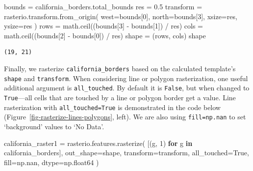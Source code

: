 \documentclass[
  letterpaper,
]{krantz}
\newenvironment{Shaded}{\begin{snugshade}}{\end{snugshade}}
\newcommand{\ControlFlowTok}[1]{\textcolor[rgb]{0.00,0.23,0.31}{\textbf{#1}}}
\newcommand{\DecValTok}[1]{\textcolor[rgb]{0.68,0.00,0.00}{#1}}
\newcommand{\FloatTok}[1]{\textcolor[rgb]{0.68,0.00,0.00}{#1}}
\newcommand{\KeywordTok}[1]{\textcolor[rgb]{0.00,0.23,0.31}{\textbf{#1}}}
\newcommand{\NormalTok}[1]{\textcolor[rgb]{0.00,0.23,0.31}{#1}}
\newcommand{\OperatorTok}[1]{\textcolor[rgb]{0.37,0.37,0.37}{#1}}
\newcommand{\VariableTok}[1]{\textcolor[rgb]{0.07,0.07,0.07}{#1}}
\begin{document}
\begin{Shaded}
\begin{Highlighting}[]
\NormalTok{bounds }\OperatorTok{=}\NormalTok{ california\_borders.total\_bounds}
\NormalTok{res }\OperatorTok{=} \FloatTok{0.5}
\NormalTok{transform }\OperatorTok{=}\NormalTok{ rasterio.transform.from\_origin(}
\NormalTok{    west}\OperatorTok{=}\NormalTok{bounds[}\DecValTok{0}\NormalTok{], }
\NormalTok{    north}\OperatorTok{=}\NormalTok{bounds[}\DecValTok{3}\NormalTok{], }
\NormalTok{    xsize}\OperatorTok{=}\NormalTok{res, }
\NormalTok{    ysize}\OperatorTok{=}\NormalTok{res}
\NormalTok{)}
\NormalTok{rows }\OperatorTok{=}\NormalTok{ math.ceil((bounds[}\DecValTok{3}\NormalTok{] }\OperatorTok{{-}}\NormalTok{ bounds[}\DecValTok{1}\NormalTok{]) }\OperatorTok{/}\NormalTok{ res)}
\NormalTok{cols }\OperatorTok{=}\NormalTok{ math.ceil((bounds[}\DecValTok{2}\NormalTok{] }\OperatorTok{{-}}\NormalTok{ bounds[}\DecValTok{0}\NormalTok{]) }\OperatorTok{/}\NormalTok{ res)}
\NormalTok{shape }\OperatorTok{=}\NormalTok{ (rows, cols)}
\NormalTok{shape}
\end{Highlighting}
\end{Shaded}

\begin{verbatim}
(19, 21)
\end{verbatim}

Finally, we rasterize \texttt{california\_borders} based on the
calculated template's \texttt{shape} and \texttt{transform}. When
considering line or polygon rasterization, one useful additional
argument is \texttt{all\_touched}. By default it is \texttt{False}, but
when changed to \texttt{True}---all cells that are touched by a line or
polygon border get a value. Line rasterization with
\texttt{all\_touched=True} is demonstrated in the code below
(Figure~\ref{fig-rasterize-lines-polygons}, left). We are also using
\texttt{fill=np.nan} to set `background' values to `No Data'.

\begin{Shaded}
\begin{Highlighting}[]
\NormalTok{california\_raster1 }\OperatorTok{=}\NormalTok{ rasterio.features.rasterize(}
\NormalTok{    [(g, }\DecValTok{1}\NormalTok{) }\ControlFlowTok{for}\NormalTok{ g }\KeywordTok{in}\NormalTok{ california\_borders],}
\NormalTok{    out\_shape}\OperatorTok{=}\NormalTok{shape,}
\NormalTok{    transform}\OperatorTok{=}\NormalTok{transform,}
\NormalTok{    all\_touched}\OperatorTok{=}\VariableTok{True}\NormalTok{,}
\NormalTok{    fill}\OperatorTok{=}\NormalTok{np.nan,}
\NormalTok{    dtype}\OperatorTok{=}\NormalTok{np.float64}
\NormalTok{)}
\end{Highlighting}
\end{Shaded}
\end{document}
